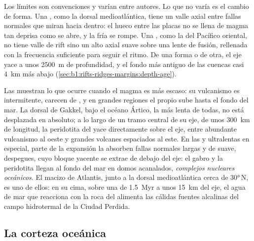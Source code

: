 Los límites son convenciones y varían entre autores. Lo que no varía es el cambio de forma. Una , como la dorsal
medioatlántica, tiene un valle axial entre fallas normales que miran hacia dentro: el hueco entre las placas no se llena de magma tan
deprisa como se abre, y la  fría se rompe. Una , como la del Pacífico oriental, no tiene valle de rift sino un
alto axial suave sobre una lente de fusión, rellenada con la frecuencia suficiente para seguir el ritmo. De una forma o de otra, el eje
yace a unos \qty{2500}{m} de profundidad, y el fondo más antiguo de las cuencas casi \qty{4}{km} más abajo
(\cref{sec:b1:rifts-ridges-margins:depth-age}).

Las  muestran lo que ocurre cuando el magma es más escaso: su vulcanismo es intermitente, carecen de , y en grandes regiones el propio  sube hasta el fondo del mar. La dorsal de Gakkel, bajo el océano Ártico, la más lenta
de todas, no está desplazada en absoluto; a lo largo de un tramo central de su eje, de unos \qty{300}{km} de longitud, la peridotita del
 yace directamente sobre el eje, entre abundante vulcanismo al oeste y grandes volcanes espaciados al este. En las  y
ultralentas en especial, parte de la expansión la absorben fallas normales largas y de  suave, despegues, cuyo bloque yacente se
extrae de debajo del eje: el gabro y la peridotita llegan al fondo del mar en domos acanalados, \emph{complejos nucleares oceánicos}. El
macizo de Atlantis, junto a la dorsal medioatlántica cerca de \ang{30}\,N, es uno de ellos: en su cima, sobre una  de
\qty{1.5}{Myr} a unos \qty{15}{km} del eje, el agua de mar que reacciona con la roca del  alimenta las cálidas fuentes alcalinas del
campo hidrotermal de la Ciudad Perdida.

\subsection*{La corteza oceánica}

